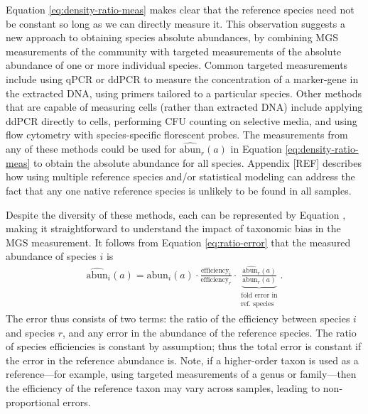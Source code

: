 \documentclass[
]{article}
\begin{document}
Equation \eqref{eq:density-ratio-meas} makes clear that the reference species need not be constant so long as we can directly measure it.
This observation suggests a new approach to obtaining species absolute abundances, by combining MGS measurements of the community with targeted measurements of the absolute abundance of one or more individual species.
Common targeted measurements include using qPCR or ddPCR to measure the concentration of a marker-gene in the extracted DNA, using primers tailored to a particular species.
Other methods that are capable of measuring cells (rather than extracted DNA) include applying ddPCR directly to cells, performing CFU counting on selective media, and using flow cytometry with species-specific florescent probes.
The measurements from any of these methods could be used for \(\widehat{\text{abun}}_{r}(a)\) in Equation \eqref{eq:density-ratio-meas} to obtain the absolute abundance for all species.
Appendix {[}REF{]} describes how using multiple reference species and/or statistical modeling can address the fact that any one native reference species is unlikely to be found in all samples.

Despite the diversity of these methods, each can be represented by Equation \label{eq:density-ratio-meas}, making it straightforward to understand the impact of taxonomic bias in the MGS measurement.
It follows from Equation \eqref{eq:ratio-error} that the measured abundance of species \(i\) is
\begin{align}
  \label{eq:density-ratio-error}
  \widehat{\text{abun}}_{i}(a) 
  = \text{abun}_{i}(a) \cdot \frac{\text{efficiency}_{i}}{\text{efficiency}_{r}}
  \cdot \underbrace{\frac{\widehat{\text{abun}_r}(a)}{\text{abun}_r(a)}}_{\substack{\text{fold error in} \\ \text{ref. species}}}.
\end{align}
The error thus consists of two terms: the ratio of the efficiency between species \(i\) and species \(r\), and any error in the abundance of the reference species.
The ratio of species efficiencies is constant by assumption; thus the total error is constant if the error in the reference abundance is.
Note, if a higher-order taxon is used as a reference---for example, using targeted measurements of a genus or family---then the efficiency of the reference taxon may vary across samples, leading to non-proportional errors.
\end{document}

